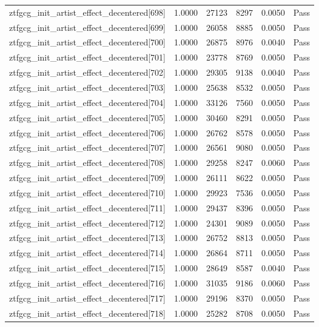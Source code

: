 \begin{table}[htbp]
\begin{tabular}{llrrll}
ztfgcg\_init\_artist\_effect\_decentered[698] & 1.0000 & 27123 & 8297 & 0.0050 & Pass \\
ztfgcg\_init\_artist\_effect\_decentered[699] & 1.0000 & 26058 & 8885 & 0.0050 & Pass \\
ztfgcg\_init\_artist\_effect\_decentered[700] & 1.0000 & 26875 & 8976 & 0.0040 & Pass \\
ztfgcg\_init\_artist\_effect\_decentered[701] & 1.0000 & 23778 & 8769 & 0.0050 & Pass \\
ztfgcg\_init\_artist\_effect\_decentered[702] & 1.0000 & 29305 & 9138 & 0.0040 & Pass \\
ztfgcg\_init\_artist\_effect\_decentered[703] & 1.0000 & 25638 & 8532 & 0.0050 & Pass \\
ztfgcg\_init\_artist\_effect\_decentered[704] & 1.0000 & 33126 & 7560 & 0.0050 & Pass \\
ztfgcg\_init\_artist\_effect\_decentered[705] & 1.0000 & 30460 & 8291 & 0.0050 & Pass \\
ztfgcg\_init\_artist\_effect\_decentered[706] & 1.0000 & 26762 & 8578 & 0.0050 & Pass \\
ztfgcg\_init\_artist\_effect\_decentered[707] & 1.0000 & 26561 & 9080 & 0.0050 & Pass \\
ztfgcg\_init\_artist\_effect\_decentered[708] & 1.0000 & 29258 & 8247 & 0.0060 & Pass \\
ztfgcg\_init\_artist\_effect\_decentered[709] & 1.0000 & 26111 & 8622 & 0.0050 & Pass \\
ztfgcg\_init\_artist\_effect\_decentered[710] & 1.0000 & 29923 & 7536 & 0.0050 & Pass \\
ztfgcg\_init\_artist\_effect\_decentered[711] & 1.0000 & 29437 & 8396 & 0.0050 & Pass \\
ztfgcg\_init\_artist\_effect\_decentered[712] & 1.0000 & 24301 & 9089 & 0.0050 & Pass \\
ztfgcg\_init\_artist\_effect\_decentered[713] & 1.0000 & 26752 & 8813 & 0.0050 & Pass \\
ztfgcg\_init\_artist\_effect\_decentered[714] & 1.0000 & 26864 & 8711 & 0.0050 & Pass \\
ztfgcg\_init\_artist\_effect\_decentered[715] & 1.0000 & 28649 & 8587 & 0.0040 & Pass \\
ztfgcg\_init\_artist\_effect\_decentered[716] & 1.0000 & 31035 & 9186 & 0.0060 & Pass \\
ztfgcg\_init\_artist\_effect\_decentered[717] & 1.0000 & 29196 & 8370 & 0.0050 & Pass \\
ztfgcg\_init\_artist\_effect\_decentered[718] & 1.0000 & 25282 & 8708 & 0.0050 & Pass \\

\end{tabular}
\end{table}
